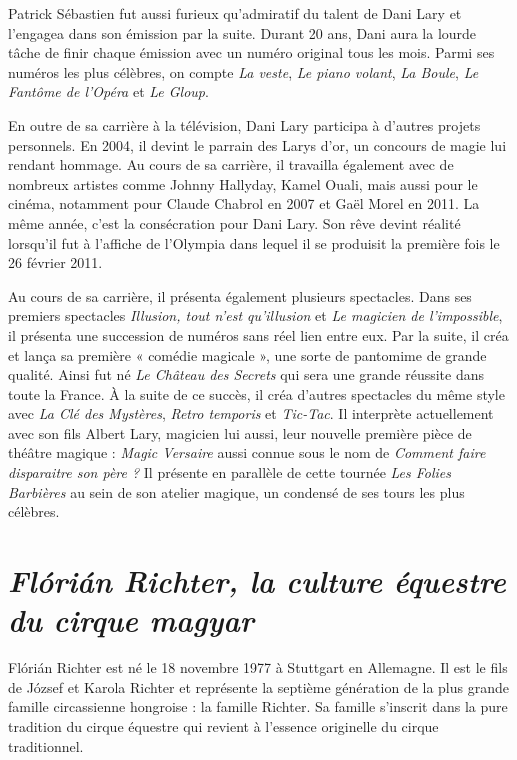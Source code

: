 Patrick Sébastien fut aussi furieux qu’admiratif du talent de Dani Lary et l’engagea dans son émission par la suite. Durant 20 ans, Dani aura la lourde tâche de finir chaque émission avec un numéro original tous les mois. Parmi ses numéros les plus célèbres, on compte \textit{La veste}, \textit{Le piano volant}, \textit{La Boule}, \textit{Le Fantôme de l’Opéra} et \textit{Le Gloup}.

En outre de sa carrière à la télévision, Dani Lary participa à d’autres projets personnels. En 2004, il devint le parrain des Larys d’or, un concours de magie lui rendant hommage. Au cours de sa carrière, il travailla également avec de nombreux artistes comme Johnny Hallyday, Kamel Ouali, mais aussi pour le cinéma, notamment pour Claude Chabrol en 2007 et Gaël Morel en 2011. La même année, c'est la consécration pour Dani Lary. Son rêve devint réalité lorsqu’il fut à l’affiche de l’Olympia dans lequel il se produisit la première fois le 26 février 2011.

Au cours de sa carrière, il présenta également plusieurs spectacles. Dans ses premiers spectacles \textit{Illusion, tout n’est qu’illusion} et \textit{Le magicien de l’impossible}, il présenta une succession de numéros sans réel lien entre eux. Par la suite, il créa et lança sa première « comédie magicale », une sorte de pantomime de grande qualité. Ainsi fut né \textit{Le Château des Secrets} qui sera une grande réussite dans toute la France. À la suite de ce succès, il créa d’autres spectacles du même style avec \textit{La Clé des Mystères}, \textit{Retro temporis} et \textit{Tic-Tac}. Il interprète actuellement avec son fils Albert Lary, magicien lui aussi, leur nouvelle première pièce de théâtre magique : \textit{Magic Versaire} aussi connue sous le nom de \textit{Comment faire disparaitre son père ?} Il présente en parallèle de cette tournée \textit{Les Folies Barbières} au sein de son atelier magique, un condensé de ses tours les plus célèbres. 

\section*{\textit{Flórián Richter, la culture équestre du cirque magyar}}
{}

Flórián Richter est né le 18 novembre 1977 à Stuttgart en Allemagne. Il est le fils de József et Karola Richter et représente la septième génération de la plus grande famille circassienne hongroise : la famille Richter. Sa famille s’inscrit dans la pure tradition du cirque équestre qui revient à l’essence originelle du cirque traditionnel. 

